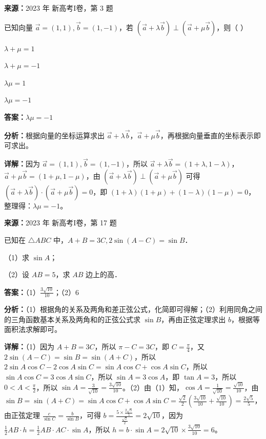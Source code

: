 \begin{question}[points=5]
\textbf{来源：}2023 年 新高考I卷，第 3 题\par
已知向量 $\vec{a}=(1,1),\vec{b}=(1,-1)$，若 $(\vec{a}+\lambda\vec{b})\perp(\vec{a}+\mu\vec{b})$，则（ ）
\begin{choices}
  \item $\lambda+\mu=1$
  \item $\lambda+\mu=-1$
  \item $\lambda\mu=1$
  \item $\lambda\mu=-1$
\end{choices}
\begin{solution}
\textbf{答案：}$\lambda\mu=-1$

\textbf{分析：}根据向量的坐标运算求出 $\vec{a}+\lambda\vec{b}$，$\vec{a}+\mu\vec{b}$，再根据向量垂直的坐标表示即可求出。

\textbf{详解：}因为 $\vec{a}=(1,1),\vec{b}=(1,-1)$，所以 $\vec{a}+\lambda\vec{b}=(1+\lambda,1-\lambda)$，$\vec{a}+\mu\vec{b}=(1+\mu,1-\mu)$，由 $(\vec{a}+\lambda\vec{b})\perp(\vec{a}+\mu\vec{b})$ 可得 $(\vec{a}+\lambda\vec{b})\cdot(\vec{a}+\mu\vec{b})=0$，即 $(1+\lambda)(1+\mu)+(1-\lambda)(1-\mu)=0$，整理得：$\lambda\mu=-1$。
\end{solution}
\end{question}

\begin{question}[points=10]
\textbf{来源：}2023 年 新高考I卷，第 17 题\par
已知在 $\triangle ABC$ 中，$A+B=3C, 2\sin(A-C)=\sin B$．

（1）求 $\sin A$；

（2）设 $AB=5$，求 $AB$ 边上的高．
\begin{solution}
\textbf{答案：}（1）$\frac{3\sqrt{10}}{10}$；（2）6

\textbf{分析：}（1）根据角的关系及两角和差正弦公式，化简即可得解；（2）利用同角之间的三角函数基本关系及两角和的正弦公式求 $\sin B$，再由正弦定理求出 $b$，根据等面积法求解即可。

\textbf{详解：}（1）因为 $A+B=3C$，所以 $\pi-C=3C$，即 $C=\frac{\pi}{4}$，又 $2\sin(A-C)=\sin B=\sin(A+C)$，所以 $2\sin A\cos C-2\cos A\sin C=\sin A\cos C+\cos A\sin C$，所以 $\sin A\cos C=3\cos A\sin C$，所以 $\sin A=3\cos A$，即 $\tan A=3$，所以 $0<A<\frac{\pi}{2}$，所以 $\sin A=\frac{3}{\sqrt{10}}=\frac{3\sqrt{10}}{10}$。（2）由（1）知，$\cos A=\frac{1}{\sqrt{10}}=\frac{\sqrt{10}}{10}$，由 $\sin B=\sin(A+C)=\sin A\cos C+\cos A\sin C=\frac{\sqrt{2}}{2}(\frac{3\sqrt{10}}{10}+\frac{\sqrt{10}}{10})=\frac{2\sqrt{5}}{5}$，由正弦定理 $\frac{c}{\sin C}=\frac{b}{\sin B}$，可得 $b=\frac{5\times\frac{2\sqrt{5}}{5}}{\frac{\sqrt{2}}{2}}=2\sqrt{10}$，因为 $\frac{1}{2}AB\cdot h=\frac{1}{2}AB\cdot AC\cdot\sin A$，所以 $h=b\cdot\sin A=2\sqrt{10}\times\frac{3\sqrt{10}}{10}=6$。
\end{solution}
\end{question}

